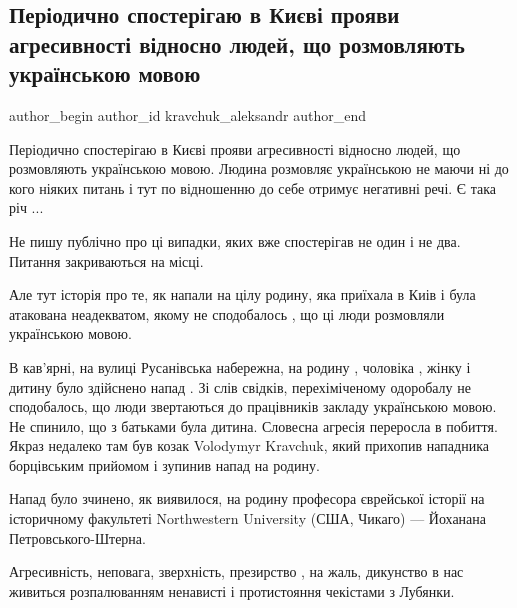  
 
 
 
 
 
\subsection{Періодично спостерігаю в Києві  прояви агресивності відносно людей, що розмовляють українською мовою}
\label{sec:28_07_2021.fb.kravchuk_aleksandr.1.mova_agressia}
 
\ifcmt
 author_begin
   author_id kravchuk_aleksandr
 author_end
\fi

Періодично спостерігаю в Києві  прояви агресивності відносно людей, що
розмовляють українською мовою. Людина розмовляє українською не маючи ні до кого
ніяких питань і тут по відношенню до себе отримує негативні речі. Є така річ
...

Не пишу публічно про ці випадки, яких вже спостерігав не один і не два. Питання
закриваються на місці.

Але тут історія про те, як напали на цілу  родину,  яка приїхала в Киів    і
була атакована неадекватом, якому не сподобалось , що ці люди розмовляли
українською мовою. 

В кав'ярні, на вулиці Русанівська набережна, на родину , чоловіка , жінку і
дитину було здійснено напад . Зі слів свідків, перехіміченому одоробалу не
сподобалось, що люди звертаються до працівників закладу українською мовою. Не
спинило, що з батьками була дитина. Словесна агресія переросла в побиття. Якраз
недалеко там був козак Volodymyr Kravchuk, який прихопив нападника борцівським
прийомом і зупинив напад на родину.

Напад було зчинено, як виявилося, на родину професора єврейської історії на
історичному факультеті Northwestern University (США, Чикаго) —  Йоханана
Петровського-Штерна.

Агресивність, неповага, зверхність, презирство , на жаль, дикунство в нас
живиться розпалюванням ненависті і протистояння чекістами з Лубянки.

